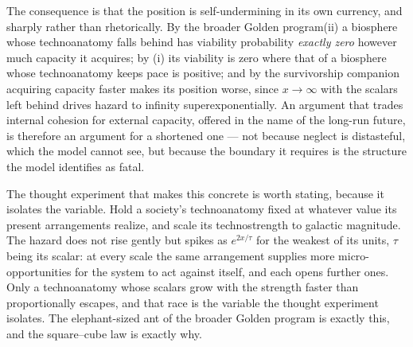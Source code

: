 The consequence is that the position is self-undermining in its own
currency, and sharply rather than rhetorically. By
the broader Golden program(ii) a biosphere whose technoanatomy falls behind has
viability probability \emph{exactly zero} however much capacity it
acquires; by (i) its viability is zero where that of a biosphere whose
technoanatomy keeps pace is
positive; and by
the survivorship companion \cite{GoldenSurvivorship} acquiring capacity faster makes its
position worse, since $x\to\infty$ with the scalars left behind drives hazard to
infinity superexponentially. An argument that trades internal cohesion
for external capacity, offered in the name of the long-run future, is
therefore an argument for a shortened one --- not because neglect is
distasteful, which the model cannot see, but because the boundary it
requires is the structure the model identifies as fatal.

The thought experiment that makes this concrete is worth stating,
because it isolates the variable. Hold a society's technoanatomy fixed
at whatever value its present arrangements realize, and scale its
technostrength to galactic magnitude. The hazard does not rise gently
but spikes as $e^{2x/\tau}$ for the weakest of its units, $\tau$ being its
scalar: at every scale the same arrangement supplies more
micro-opportunities for the system to act against itself, and each
opens further ones. Only a technoanatomy whose scalars grow with the strength faster than proportionally escapes, and that race is the variable the thought experiment isolates. The elephant-sized ant of
the broader Golden program is exactly this, and the square--cube
law is exactly why.

